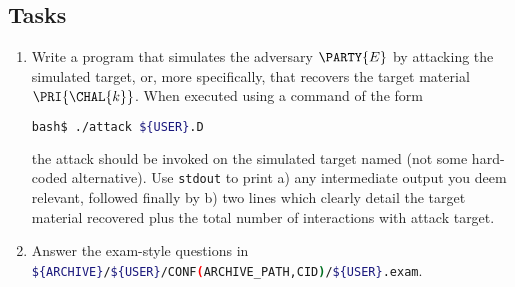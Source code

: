 \documentclass[crop={false},multi={true},tikz={true}]{standalone}
\begin{document}
\subsection{Tasks}

\begin{enumerate}
\item Write a program that simulates the adversary $\PARTY{E}$ by attacking
      the simulated target, or, more specifically, that recovers the target 
      material $\PRI{\CHAL{k}}$.  
      When executed using a command of the form

      \begin{lstlisting}[language={bash},gobble={6}]
      bash$ ./attack ${USER}.D
      \end{lstlisting}

      \noindent
      the attack should be invoked on the simulated target named (not some
      hard-coded alternative).  Use \lstinline[language={bash}]{stdout} to 
      print 
      a) any intermediate output you deem relevant, followed finally by 
      b) two lines which clearly detail the target material recovered plus
         the total number of interactions with attack target.
\item Answer the exam-style questions in 
      \lstinline[language={bash}]|${ARCHIVE}/${USER}/CONF(ARCHIVE_PATH,CID)/${USER}.exam|.
\end{enumerate}


\ifstandalone
\printbibliography
\fi
\end{document}
